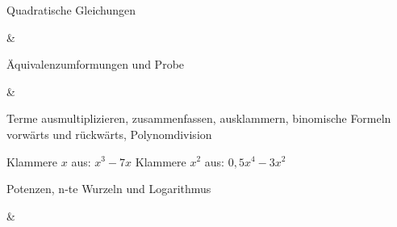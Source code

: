 \setcounter{aufgabe}{0}

\begin{aufgabe}{Quadratische Gleichungen}
\begin{gleichungsraster}[2]
 &
 \\
\end{gleichungsraster}
\end{aufgabe}

\begin{aufgabe}{Äquivalenzumformungen und Probe}
\begin{gleichungsraster}[2]
 &
 \\
\end{gleichungsraster}
\end{aufgabe}

\begin{aufgabe}{Terme ausmultiplizieren, zusammenfassen, ausklammern, binomische Formeln vorwärts und rückwärts, Polynomdivision}
\begin{teile}
\teil Klammere $x$ aus: $x^3 - 7x$
\teil Klammere $x^2$ aus: $0{,}5x^4 - 3x^2$
\end{teile}
\end{aufgabe}

\begin{aufgabe}{Potenzen, n-te Wurzeln und Logarithmus}
\begin{gleichungsraster}[2]
 &
 \\
\end{gleichungsraster}
\end{aufgabe}

